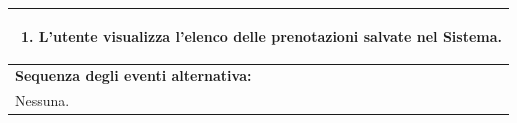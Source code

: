 \documentclass{article}
\begin{document}
\begin{table}[H]
\begin{tabular}{|p{\linewidth}|}
                        \begin{minipage}{\linewidth}
                            \begin{enumerate}
                                \item L'utente visualizza l'elenco delle prenotazioni salvate nel Sistema. %
                            \end{enumerate}  
                        \end{minipage}
                        \vspace{-10pt} \\
                        \hline
                        \textbf{Sequenza degli eventi alternativa:} \\
                        Nessuna. \\
                        \hline
                    \end{tabular}
                \end{table}
\end{document}
